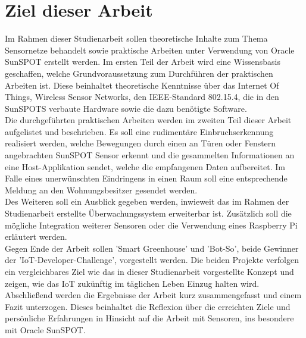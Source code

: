 \section{Ziel dieser Arbeit}\label{s:Ziel} %

Im Rahmen dieser Studienarbeit sollen theoretische Inhalte zum Thema Sensornetze behandelt sowie praktische Arbeiten unter Verwendung von Oracle SunSPOT erstellt werden. Im ersten Teil der Arbeit wird eine Wissensbasis geschaffen, welche Grundvoraussetzung zum Durchführen der praktischen Arbeiten ist. Diese beinhaltet theoretische Kenntnisse über das Internet Of Things, Wireless Sensor Networks, den IEEE-Standard 802.15.4, die in den SunSPOTS verbaute Hardware sowie die dazu benötigte Software.\\

Die durchgeführten praktischen Arbeiten werden im zweiten Teil dieser Arbeit aufgelistet und beschrieben. Es soll eine rudimentäre Einbruchserkennung realisiert werden, welche Bewegungen durch einen an Türen oder Fenstern angebrachten SunSPOT Sensor erkennt und die gesammelten Informationen an eine Host-Applikation sendet, welche die empfangenen Daten aufbereitet. Im Falle eines unerwünschten Eindringens in einen Raum soll eine entsprechende Meldung an den Wohnungsbesitzer gesendet werden.\\
Des Weiteren soll ein Ausblick gegeben werden, inwieweit das im Rahmen der Studienarbeit erstellte Überwachungssystem erweiterbar ist. Zusätzlich soll die mögliche Integration weiterer Sensoren oder die Verwendung eines Raspberry Pi erläutert werden.\\

Gegen Ende der Arbeit sollen 'Smart Greenhouse' und 'Bot-So', beide Gewinner der 'IoT-Developer-Challenge', vorgestellt werden. Die beiden Projekte verfolgen ein vergleichbares Ziel wie das in dieser Studienarbeit vorgestellte Konzept und zeigen, wie das IoT zukünftig im täglichen Leben Einzug halten wird. \\

Abschließend werden die Ergebnisse der Arbeit kurz zusammengefasst und einem Fazit unterzogen. Dieses beinhaltet die Reflexion über die erreichten Ziele und persönliche Erfahrungen in Hinsicht auf die Arbeit mit Sensoren, ins besondere mit Oracle SunSPOT.